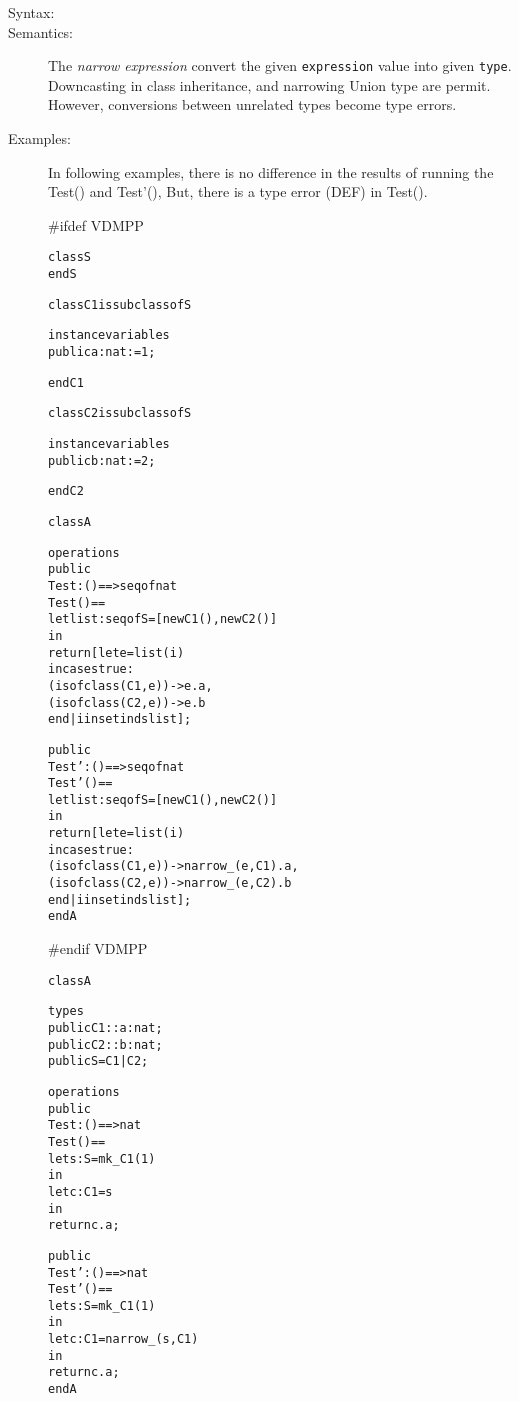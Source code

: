 \documentclass[\pformat,12pt]{article}
\begin{document}
\begin{description}
\item[Syntax:]


    \item[Semantics:] The {\it narrow expression} convert the given {\tt expression} value into given {\tt type}.
	Downcasting in class inheritance, and narrowing Union type are permit.
	However, conversions between unrelated types become type errors.
    
    \item[Examples:] In following examples, there is no difference in the results of running the Test() and Test'(), 
	But, there is a type error (DEF) in Test().

#ifdef VDMPP
      \begin{alltt}
class S
end S

class C1 is subclass of S

instance variables
public a : nat := 1;

end C1

class C2 is subclass of S

instance variables
public b : nat := 2;

end C2

class A

operations
public
Test: () ==>  seq of nat
Test() ==
 let list : seq of S = [ new C1(), new C2() ]
 in
   return [ let e = list(i)
            in cases true:
                (isofclass(C1, e)) -> e.a,
                (isofclass(C2, e)) -> e.b
               end | i in set inds list ];

public
Test': () ==>  seq of nat
Test'() ==
 let list : seq of S = [ new C1(), new C2() ]
 in
   return [ let e = list(i)
            in cases true:
                (isofclass(C1, e)) -> narrow_(e, C1).a,
                (isofclass(C2, e)) -> narrow_(e, C2).b
               end | i in set inds list ];
end A
      \end{alltt}
#endif VDMPP
 
      \begin{alltt}
class A

types
public C1 :: a : nat;
public C2 :: b : nat;
public S = C1 | C2;

operations
public
Test: () ==> nat
Test() ==
 let s : S = mk_C1(1)
 in
   let c : C1 = s
   in
     return c.a;

public
Test': () ==> nat
Test'() ==
 let s : S = mk_C1(1)
 in
   let c : C1 = narrow_(s, C1)
   in
     return c.a;
end A
      \end{alltt}

\end{description}
\end{document}
